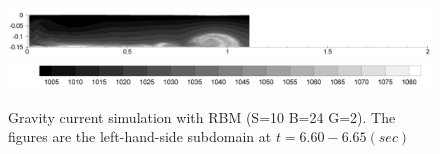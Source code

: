 \begin{figure}[htbp]
\begin{center}
\includegraphics[scale=0.35]{../figures/Exp3-CASE1-dt0.005/rec_2_buf_24_sub_10/D2-110.pdf}
    \includegraphics[scale=0.35]{../figures/Exp3-CASE1-dt0.005/legend.pdf}
    \caption{Gravity current simulation with RBM (S=10 B=24 G=2). The figures are the left-hand-side subdomain at $t=6.60-6.65(sec)$}
    \label{fig:RBM-GC-2Domain-L-S10-B24-G2-660}
  \end{center}
\end{figure}

\cp

